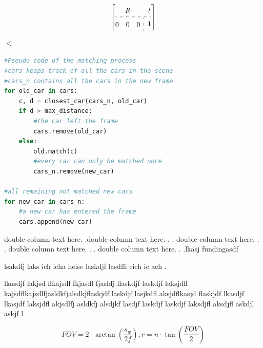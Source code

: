 \documentclass[conference]{IEEEtran}
\begin{document}
\[
    \renewcommand{\arraystretch}{1.5}
    \left[\begin{array}{@{}c:c@{}}
            R                        & t \\ \hdashline
            \begin{array}{@{}ccc@{}}
                0 & 0 & 0
            \end{array} & 1
        \end{array}\right]
\]

$\leq$

\begin{lstlisting}[language=Python, basicstyle=\small, tabsize=4]
#Pseudo code of the matching process
#cars keeps track of all the cars in the scene
#cars_n contains all the cars in the new frame
for old_car in cars:
    c, d = closest_car(cars_n, old_car)
	if d > max_distance:
        #the car left the frame
	    cars.remove(old_car)
	else:
        old.match(c)
        #every car can only be matched once
        cars_n.remove(new_car)

#all remaining not matched new cars
for new_car in cars_n: 
    #a new car has entered the frame 
    cars.append(new_car) 
\end{lstlisting}
  

\begin{multicols}{2}

    double column text here. .double column text here. . .
    double column text here. . .
    double column text here. . .
    double column text here. . .lkasj fundingasdf

    lsakdfj laks ich icha heise laskdjf lasdffi cich ic ach
    .

\end{multicols}
lkasdjf lakjsd flkajsdl fkjasdl fjasldj flaskdjf laskdjf laksjdfl kajsdflkajsdlfjasldkfjalsdkjflaskjdf laskdjf lasjkdfl aksjdflkasjd flaskjdf lkasdjf lkasjdf laksjdfl akjsdlfj asldkfj alsdjkf lasdjf laskdjf laskdjf laksdjfl aksdjfl askdjl askjf l

\begin{equation}
    FOV = 2 \cdot \arctan\left(\frac{s_w}{2f}\right),
    r = n \cdot \tan\left(\frac{FOV}{2}\right)
\end{equation}
\end{document}
